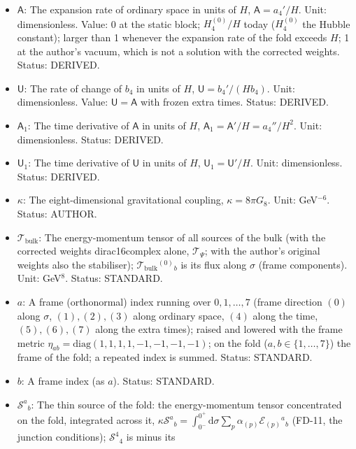 \documentclass[
  10pt,
]{article}
\providecommand{\tightlist}{%
  \setlength{\itemsep}{0pt}\setlength{\parskip}{0pt}}
\begin{document}
\begin{itemize}
\tightlist
\item
  \(\mathsf{A}\): The expansion rate of ordinary space in units of
  \(H\), \(\mathsf{A} = a_4'/H\). Unit: dimensionless. Value: 0 at the
  static block; \(H_4^{(0)}/H\) today (\(H_4^{(0)}\) the Hubble
  constant); larger than 1 whenever the expansion rate of the fold
  exceeds \(H\); 1 at the author's vacuum, which is not a solution with
  the corrected weights. Status: DERIVED.
\item
  \(\mathsf{U}\): The rate of change of \(b_4\) in units of \(H\),
  \(\mathsf{U} = b_4'/(Hb_4)\). Unit: dimensionless. Value:
  \(\mathsf{U} = \mathsf{A}\) with frozen extra times. Status: DERIVED.
\item
  \(\mathsf{A}_1\): The time derivative of \(\mathsf{A}\) in units of
  \(H\), \(\mathsf{A}_1 = \mathsf{A}'/H = a_4''/H^2\). Unit:
  dimensionless. Status: DERIVED.
\item
  \(\mathsf{U}_1\): The time derivative of \(\mathsf{U}\) in units of
  \(H\), \(\mathsf{U}_1 = \mathsf{U}'/H\). Unit: dimensionless. Status:
  DERIVED.
\item
  \(\kappa\): The eight-dimensional gravitational coupling,
  \(\kappa = 8\pi G_8\). Unit: GeV\(^{-6}\). Status: AUTHOR.
\item
  \(\mathcal{T}_{\mathrm{bulk}}\): The energy-momentum tensor of all
  sources of the bulk (with the corrected weights dirac16complex alone,
  \(\mathcal{T}_\Psi\); with the author's original weights also the
  stabiliser); \(\mathcal{T}_{\mathrm{bulk}}{}^{(0)}{}_b\) is its flux
  along \(\sigma\) (frame components). Unit: GeV\(^8\). Status:
  STANDARD.
\item
  \(a\): A frame (orthonormal) index running over \(0, 1, \dots, 7\)
  (frame direction \((0)\) along \(\sigma\), \((1), (2), (3)\) along
  ordinary space, \((4)\) along the time, \((5), (6), (7)\) along the
  extra times); raised and lowered with the frame metric
  \(\eta_{ab} = \mathrm{diag}(1, 1, 1, 1, -1, -1, -1, -1)\); on the fold
  (\(a, b \in \{1, \dots, 7\}\)) the frame of the fold; a repeated index
  is summed. Status: STANDARD.
\item
  \(b\): A frame index (as \(a\)). Status: STANDARD.
\item
  \(\mathcal{S}^a{}_b\): The thin source of the fold: the
  energy-momentum tensor concentrated on the fold, integrated across it,
  \(\kappa\mathcal{S}^a{}_b = \int_{0^-}^{0^+}\mathrm{d}\sigma\sum_p\alpha_{(p)}\mathcal{E}_{(p)}{}^a{}_b\)
  (FD-11, the junction conditions); \(\mathcal{S}^4{}_4\) is minus its

\end{itemize}
\end{document}
